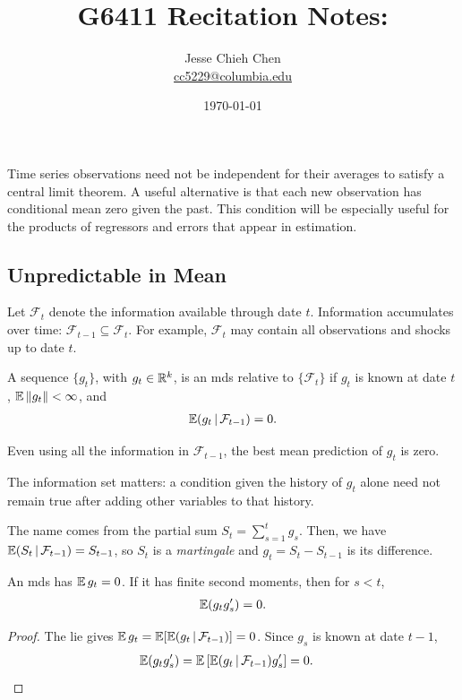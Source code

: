 \documentclass[a4paper,12pt]{article}
\title{G6411 Recitation Notes: \glsentrylong{mds}}
\author{Jesse Chieh Chen\\\href{mailto:cc5229@columbia.edu}{cc5229@columbia.edu}}
\date{\today}
\begin{document}
\appendix
\section{}

Time series observations need not be independent for their averages to satisfy a central limit theorem.
A useful alternative is that each new observation has conditional mean zero given the past.
This condition will be especially useful for the products of regressors and errors that appear in estimation.

\subsection{Unpredictable in Mean}

Let $\mathcal F_t$ denote the information available through date $t$.
Information accumulates over time: $\mathcal F_{t-1}\subseteq\mathcal F_t$.
For example, $\mathcal F_t$ may contain all observations and shocks up to date $t$.

\begin{definition}
	A sequence $\{g_t\}$, with $g_t\in\mathbb{R}^k$, is an \gls{mds} relative to $\{\mathcal F_t\}$ if
	$g_t$ is known at date $t$, $\operatorname{\mathbb{E}}\|g_t\|<\infty$, and
	\begin{align}\label{eq-mds}
		\operatorname{\mathbb{E}}(g_t\mathpunct{}|\mathpunct{}\mathcal F_{t-1})=0.
	\end{align}
\end{definition}

\begin{remark}[Interpretation]
	Even using all the information in $\mathcal F_{t-1}$,
	the best mean prediction of $g_t$ is zero.
\end{remark}

\begin{remark}
	The information set matters:
	a condition given the history of $g_t$ alone need not remain true after adding other variables to that history.
\end{remark}

\begin{remark}
	The name comes from the partial sum $S_t=\sum_{s=1}^t g_s$.
	Then, we have $\operatorname{\mathbb{E}}(S_t\mathpunct{}|\mathpunct{}\mathcal F_{t-1})=S_{t-1}$, so $S_t$ is a \emph{martingale} and $g_t=S_t-S_{t-1}$ is its difference.
\end{remark}

\begin{proposition}\label{prop-mds-orthogonal}
	An \gls{mds} has $\operatorname{\mathbb{E}} g_t=0$.
	If it has finite second moments, then for $s<t$,
	\begin{align}
		\operatorname{\mathbb{E}}(g_tg_s^{\prime})=0.
	\end{align}
\end{proposition}
\begin{proof}
	The \gls{lie} gives $\operatorname{\mathbb{E}} g_t=\operatorname{\mathbb{E}}[\operatorname{\mathbb{E}}(g_t\mathpunct{}|\mathpunct{}\mathcal F_{t-1})]=0$.
	Since $g_s$ is known at date $t-1$,
	\begin{align*}
		\operatorname{\mathbb{E}}(g_tg_s^{\prime})
		&=\operatorname{\mathbb{E}}\left[\operatorname{\mathbb{E}}(g_t\mathpunct{}|\mathpunct{}\mathcal F_{t-1})g_s^{\prime}\right]=0.
		\qedhere
	\end{align*}
\end{proof}
\end{document}
